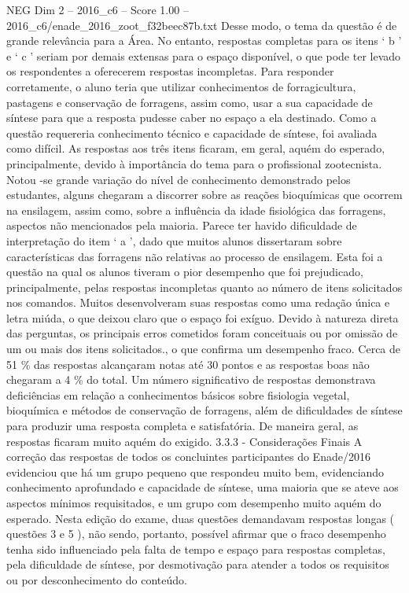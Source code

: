 \begin{textsample}{NEG Dim 2 – 2016\_c6 – Score 1.00 – 2016\_c6/enade\_2016\_zoot\_f32beec87b.txt}
Desse modo, o tema da questão é de grande relevância para a Área.
No entanto, respostas completas para os itens ‘ b ’ e ‘ c ’ seriam por demais extensas para o espaço disponível, o que pode ter levado os respondentes a oferecerem respostas incompletas.
Para responder corretamente, o aluno teria que utilizar conhecimentos de forragicultura, pastagens e conservação de forragens, assim como, usar a sua capacidade de síntese para que a resposta pudesse caber no espaço a ela destinado.
Como a questão requereria conhecimento técnico e capacidade de síntese, foi avaliada como difícil.
As respostas aos três itens ficaram, em geral, aquém do esperado, principalmente, devido à importância do tema para o profissional zootecnista.
Notou -se grande variação do nível de conhecimento demonstrado pelos estudantes, alguns chegaram a discorrer sobre as reações bioquímicas que ocorrem na ensilagem, assim como, sobre a influência da idade fisiológica das forragens, aspectos não mencionados pela maioria.
Parece ter havido dificuldade de interpretação do item ‘ a ’, dado que muitos alunos dissertaram sobre características das forragens não relativas ao processo de ensilagem.
Esta foi a questão na qual os alunos tiveram o pior desempenho que foi prejudicado, principalmente, pelas respostas incompletas quanto ao número de itens solicitados nos comandos.
Muitos desenvolveram suas respostas como uma redação única e letra miúda, o que deixou claro que o espaço foi exíguo.
Devido à natureza direta das perguntas, os principais erros cometidos foram conceituais ou por omissão de um ou mais dos itens solicitados., o que confirma um desempenho fraco.
Cerca de 51 \% das respostas alcançaram notas até 30 pontos e as respostas boas não chegaram a 4 \% do total.
Um número significativo de respostas demonstrava deficiências em relação a conhecimentos básicos sobre fisiologia vegetal, bioquímica e métodos de conservação de forragens, além de dificuldades de síntese para produzir uma resposta completa e satisfatória.
De maneira geral, as respostas ficaram muito aquém do exigido. 3.3.3 - Considerações Finais A correção das respostas de todos os concluintes participantes do Enade/2016 evidenciou que há um grupo pequeno que respondeu muito bem, evidenciando conhecimento aprofundado e capacidade de síntese, uma maioria que se ateve aos aspectos mínimos requisitados, e um grupo com desempenho muito aquém do esperado.
Nesta edição do exame, duas questões demandavam respostas longas ( questões 3 e 5 ), não sendo, portanto, possível afirmar que o fraco desempenho tenha sido influenciado pela falta de tempo e espaço para respostas completas, pela dificuldade de síntese, por desmotivação para atender a todos os requisitos ou por desconhecimento do conteúdo.

\end{textsample}
